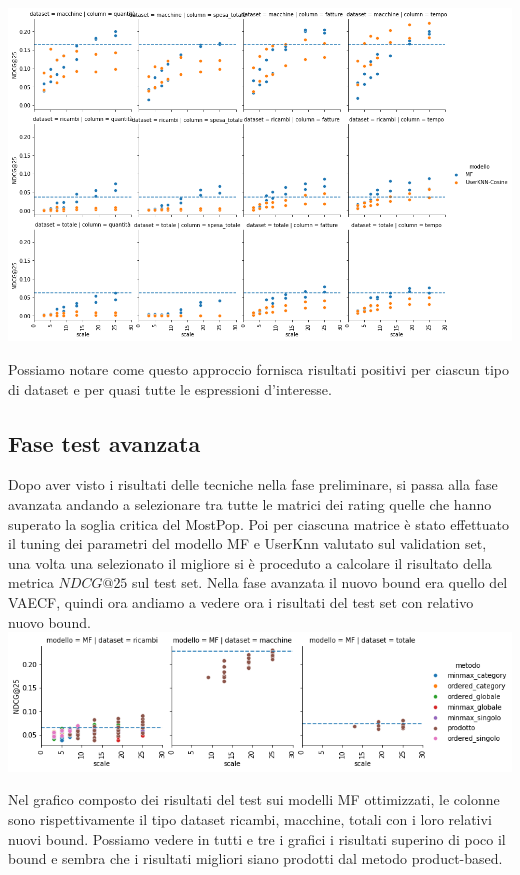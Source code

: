 \includegraphics[width=16cm]{figures/prodotto.png}

Possiamo notare come questo approccio fornisca risultati positivi per ciascun tipo di dataset e per quasi tutte le espressioni d'interesse.

\subsection{Fase test avanzata}
Dopo aver visto i risultati delle tecniche nella fase preliminare, si passa alla fase avanzata andando a selezionare tra tutte le matrici dei rating quelle che hanno superato la soglia critica del MostPop. Poi per ciascuna matrice è stato effettuato il tuning dei parametri del modello MF e UserKnn valutato sul validation set, una volta una selezionato il migliore si è proceduto a calcolare il risultato della metrica $NDCG@25$ sul test set.
Nella fase avanzata il nuovo bound era quello del VAECF, quindi ora andiamo a vedere ora i risultati del test set con relativo nuovo bound.\\

\includegraphics[width=16cm]{figures/validazione_mf.png}

Nel grafico composto dei risultati del test sui modelli MF ottimizzati, le colonne sono rispettivamente il tipo dataset ricambi, macchine, totali con i loro relativi nuovi bound. Possiamo vedere in tutti e tre i grafici i risultati superino di poco il bound e sembra che i risultati migliori siano prodotti dal metodo product-based.\\

